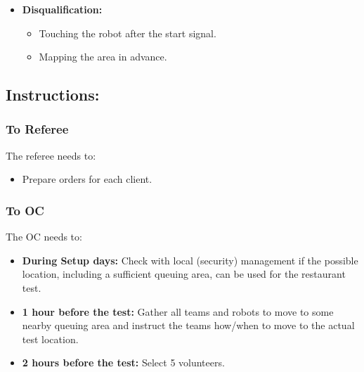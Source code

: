 \begin{itemize}
\begin{itemize}
		\item Each Deus Ex Machina penalty for skipping manipulation will only be applied twice per order so receiving an order with three objects is not more punishing.
		\item If the robot detects a customer but does not reach their table, the robot must clearly show who was detected to receive points, i.e. displaying a picture of the person.
		\item When a team is at the front of the queue, they are allowed to begin their startup procedure (the robot must remain in place). When it is their turn, they must bring the robot directly and in a straight line from the front of the queue to the start location. Once at the start location only slight movements are allowed (no moving back and forth, no full rotations etc.)
	\end{itemize}
	\item \textbf{Disqualification:}
	\begin{itemize}
		\item Touching the robot after the start signal.
		\item Mapping the area in advance.
	\end{itemize}
\end{itemize}

\subsection*{Instructions:}

\subsubsection*{To Referee}

The referee needs to:
\begin{itemize}
	\item Prepare orders for each client.
\end{itemize}

\subsubsection*{To OC}
The OC needs to:
\begin{itemize}[nosep]
	\item \textbf{During Setup days:} Check with local (security) management if the possible location, including a sufficient queuing area, can be used for the restaurant test.
	\item \textbf{1 hour before the test:} Gather all teams and robots to move to some nearby queuing area and instruct the teams how/when to move to the actual test location.
	\item \textbf{2 hours before the test:} Select 5 volunteers. 
\end{itemize}

